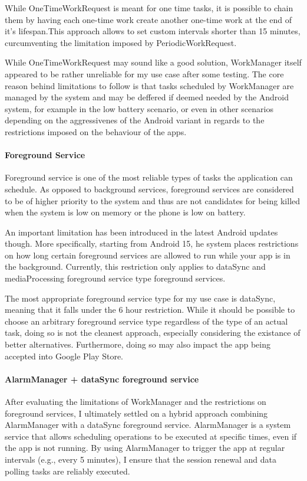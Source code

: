 While OneTimeWorkRequest is meant for one time tasks, it is possible to chain them by having each one-time work create another one-time work at the end of it's lifespan.This approach allows to set custom intervals shorter than 15 minutes, curcumventing the limitation imposed by PeriodicWorkRequest.

While OneTimeWorkRequest may sound like a good solution, WorkManager itself appeared to be rather unreliable for my use case after some testing. The core reason behind limitations to follow is that tasks scheduled by WorkManager are managed by the system and may be deffered if deemed needed by the Android system, for example in the low battery scenario, or even in other scenarios depending on the aggressivenes of the Android variant in regards to the restrictions imposed on the behaviour of the apps.

\paragraph{Foreground Service}
Foreground service is one of the most reliable types of tasks the application can schedule. As opposed to background services, foreground services are considered to be of higher priority to the system and thus are not candidates for being killed when the system is low on memory or the phone is low on battery.

An important limitation has been introduced in the latest Android updates though. More specifically, starting from Android 15, he system places restrictions on how long certain foreground services are allowed to run while your app is in the background. Currently, this restriction only applies to dataSync and mediaProcessing foreground service type foreground services.

The most appropriate foreground service type for my use case is dataSync, meaning that it falls under the 6 hour restriction. While it should be possible to choose an arbitrary foreground service type regardless of the type of an actual task, doing so is not the cleanest approach, especially considering the existance of better alternatives. Furthermore, doing so may also impact the app being accepted into Google Play Store.

\paragraph{AlarmManager + dataSync foreground service}

After evaluating the limitations of WorkManager and the restrictions on foreground services, I ultimately settled on a hybrid approach combining AlarmManager with a dataSync foreground service. AlarmManager is a system service that allows scheduling operations to be executed at specific times, even if the app is not running. By using AlarmManager to trigger the app at regular intervals (e.g., every 5 minutes), I ensure that the session renewal and data polling tasks are reliably executed.

